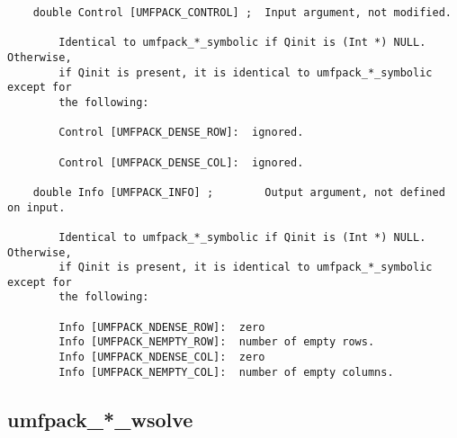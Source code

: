 {\begin{verbatim}
    double Control [UMFPACK_CONTROL] ;  Input argument, not modified.

        Identical to umfpack_*_symbolic if Qinit is (Int *) NULL.  Otherwise,
        if Qinit is present, it is identical to umfpack_*_symbolic except for
        the following:

        Control [UMFPACK_DENSE_ROW]:  ignored.

        Control [UMFPACK_DENSE_COL]:  ignored.

    double Info [UMFPACK_INFO] ;        Output argument, not defined on input.

        Identical to umfpack_*_symbolic if Qinit is (Int *) NULL.  Otherwise,
        if Qinit is present, it is identical to umfpack_*_symbolic except for
        the following:

        Info [UMFPACK_NDENSE_ROW]:  zero
        Info [UMFPACK_NEMPTY_ROW]:  number of empty rows.
        Info [UMFPACK_NDENSE_COL]:  zero
        Info [UMFPACK_NEMPTY_COL]:  number of empty columns.
\end{verbatim}
}

\newpage
\subsection{umfpack\_*\_wsolve}

